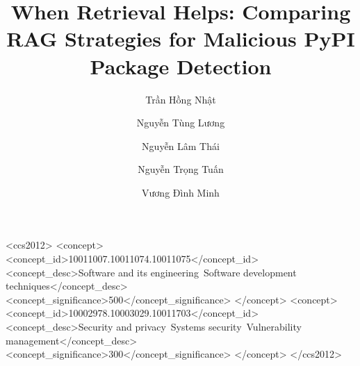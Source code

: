 \documentclass[sigconf, nonacm]{acmart}
\begin{document}
\title{When Retrieval Helps: Comparing RAG Strategies for Malicious PyPI Package Detection}

\author{Trần Hồng Nhật}

\author{Nguyễn Tùng Lương}

\author{Nguyễn Lâm Thái}

\author{Nguyễn Trọng Tuấn}

\author{Vương Đình Minh}

\renewcommand{\shortauthors}{Trần Hồng Nhật et al.}



\begin{CCSXML}
<ccs2012>
 <concept>
  <concept_id>10011007.10011074.10011075</concept_id>
  <concept_desc>Software and its engineering~Software development techniques</concept_desc>
  <concept_significance>500</concept_significance>
 </concept>
 <concept>
  <concept_id>10002978.10003029.10011703</concept_id>
  <concept_desc>Security and privacy~Systems security~Vulnerability management</concept_desc>
  <concept_significance>300</concept_significance>
 </concept>
</ccs2012>
\end{CCSXML}


\maketitle













\end{document}
